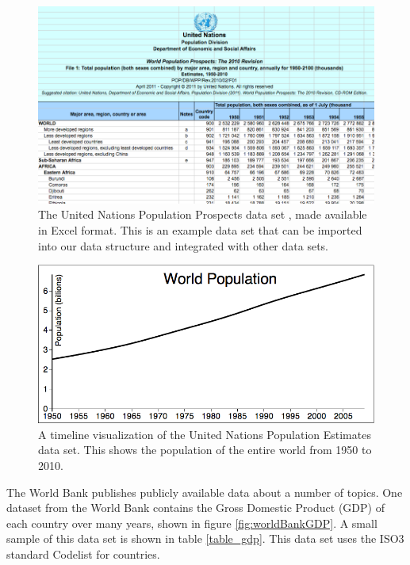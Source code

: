 \begin{figure}
  \centering
  \includegraphics[width=\figureWidth]{figs/UN_World_Population_Spreadsheet.png}
  \caption [United Nations Population Prospects Data Set]{The United Nations Population Prospects data set \cite{unPopData}, made available in Excel format. This is an example data set that can be imported into our data structure and integrated with other data sets.}
  \label{fig:unPopExcel}
\end{figure}

\begin{figure}
  \centering
  \includegraphics[width=\figureWidth]{figs/unTimeline.png}
  \caption [World Population Timeline]{A timeline visualization of the United Nations Population Estimates data set. This shows the population of the entire world from 1950 to 2010.}
  \label{fig:unTimeline}
\end{figure}

The World Bank publishes publicly available data about a number of topics. One dataset from the World Bank contains the Gross Domestic Product (GDP) of each country over many years, shown in figure \ref{fig:worldBankGDP}. A small sample of this data set is shown in table \ref{table_gdp}. This data set uses the ISO3 standard Codelist for countries.


